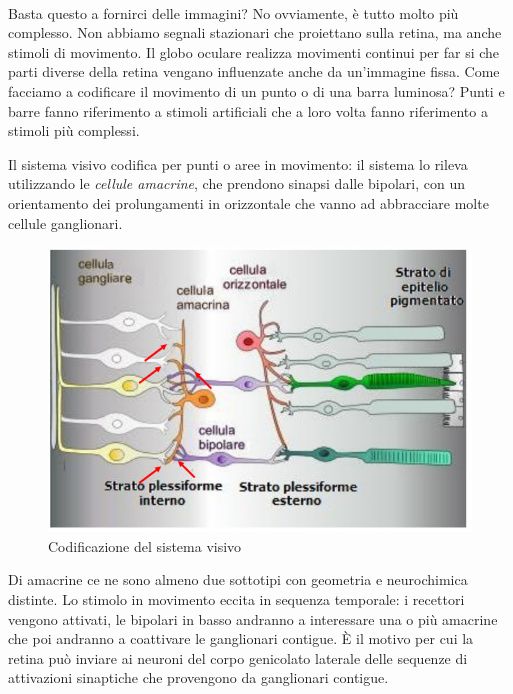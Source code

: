 \documentclass[a4paper,12pt]{article}
\begin{document}
\paragraph{}
Basta questo a fornirci delle immagini? No ovviamente, è tutto molto più complesso.
Non abbiamo segnali stazionari che proiettano sulla retina, ma anche stimoli di movimento. Il globo oculare realizza movimenti continui per far si che parti diverse della retina vengano influenzate anche da un'immagine fissa. Come facciamo a codificare il movimento di un punto o di una barra luminosa? Punti e barre fanno riferimento a stimoli artificiali che a loro volta fanno riferimento a stimoli più complessi.

Il sistema visivo codifica per punti o aree in movimento: il sistema lo rileva utilizzando le \emph{cellule amacrine}, che prendono sinapsi dalle bipolari, con un orientamento dei prolungamenti in orizzontale che vanno ad abbracciare molte cellule ganglionari. 

\begin{figure}[H]
\centering
\includegraphics[scale=0.4]{immagine/amacrina.jpg}
\caption{Codificazione del sistema visivo}
\end{figure} 
 
Di amacrine ce ne sono almeno due sottotipi con geometria e neurochimica distinte. Lo stimolo in movimento eccita in sequenza temporale: i recettori vengono attivati, le bipolari in basso andranno a interessare una o più amacrine che poi andranno a coattivare le ganglionari contigue. È il motivo per cui la retina può inviare ai neuroni del corpo genicolato laterale delle sequenze di attivazioni sinaptiche che provengono da ganglionari contigue.
\end{document}
